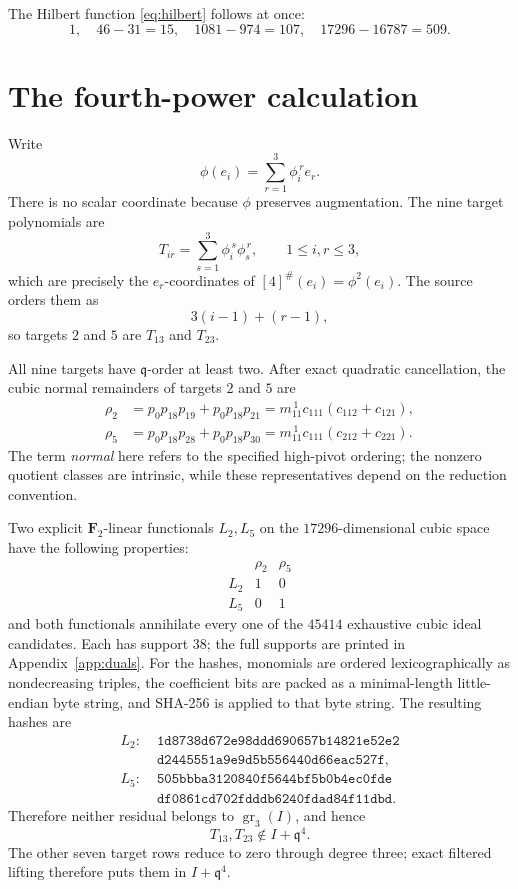 \documentclass[11pt]{article}
\theoremstyle{remark}
\newcommand{\F}{\mathbf F}
\newcommand{\gr}{\operatorname{gr}}
\newcommand{\q}{\mathfrak q}
\begin{document}
The Hilbert function \eqref{eq:hilbert} follows at once:
\[
 1,\quad46-31=15,\quad1081-974=107,
 \quad17296-16787=509.
\]

\section{The fourth-power calculation}

Write
\[
  \phi(e_i)=\sum_{r=1}^3\phi_i^{\,r}e_r.
\]
There is no scalar coordinate because \(\phi\) preserves augmentation.  The
nine target polynomials are
\begin{equation}\label{eq:targets}
  T_{ir}=\sum_{s=1}^3\phi_i^{\,s}\phi_s^{\,r},
  \qquad1\le i,r\le3,
\end{equation}
which are precisely the \(e_r\)-coordinates of
\([4]^\#(e_i)=\phi^2(e_i)\).  The source orders them as
\[
  3(i-1)+(r-1),
\]
so targets \(2\) and \(5\) are \(T_{13}\) and \(T_{23}\).

All nine targets have \(\q\)-order at least two.  After exact quadratic
cancellation, the cubic normal remainders of targets \(2\) and \(5\) are
\begin{align}
 \rho_2
 &=p_0p_{18}p_{19}+p_0p_{18}p_{21}
   =m_{11}^{\,1}c_{111}(c_{112}+c_{121}),\label{eq:rho2}\\
 \rho_5
 &=p_0p_{18}p_{28}+p_0p_{18}p_{30}
   =m_{11}^{\,1}c_{111}(c_{212}+c_{221}).\label{eq:rho5}
\end{align}
The term \emph{normal} here refers to the specified high-pivot ordering; the
nonzero quotient classes are intrinsic, while these representatives depend
on the reduction convention.

Two explicit \(\F_2\)-linear functionals \(L_2,L_5\) on the \(17296\)-dimensional
cubic space have the following properties:
\[
\begin{array}{c|cc}
 &\rho_2&\rho_5\\\hline
 L_2&1&0\\
 L_5&0&1
\end{array}
\]
and both functionals annihilate every one of the \(45414\) exhaustive cubic
ideal candidates.  Each has support \(38\); the full supports are printed in
Appendix~\ref{app:duals}.  For the hashes, monomials are ordered
lexicographically as nondecreasing triples, the coefficient bits are packed
as a minimal-length little-endian byte string, and SHA-256 is applied to that
byte string.  The resulting hashes are
\begin{align*}
L_2:\;&\texttt{1d8738d672e98ddd690657b14821e52e2}\\
     &\texttt{d2445551a9e9d5b556440d66eac527f},\\[2pt]
L_5:\;&\texttt{505bbba3120840f5644bf5b0b4ec0fde}\\
     &\texttt{df0861cd702fdddb6240fdad84f11dbd}.
\end{align*}
Therefore neither residual belongs to \(\gr_3(I)\), and hence
\[
  T_{13},T_{23}\notin I+\q^4.
\]
The other seven target rows reduce to zero through degree three; exact
filtered lifting therefore puts them in \(I+\q^4\).
\end{document}
